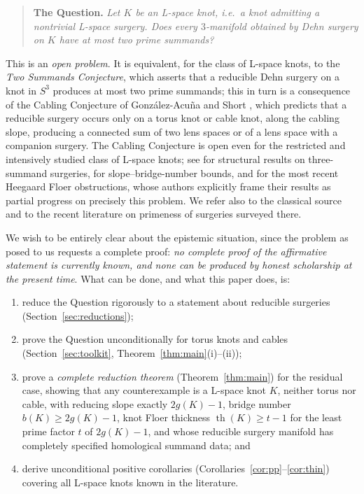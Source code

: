 \documentclass[11pt]{amsart}
\theoremstyle{definition}
\theoremstyle{remark}
\numberwithin{equation}{section}
\begin{document}
\begin{quote}
\textbf{The Question.} \emph{Let $K$ be an L-space knot, i.e.\ a knot
admitting a nontrivial L-space surgery. Does every $3$-manifold obtained
by Dehn surgery on $K$ have at most two prime summands?}
\end{quote}

This is an \emph{open problem}. It is equivalent, for the class of
L-space knots, to the \emph{Two Summands Conjecture}, which asserts that a
reducible Dehn surgery on a knot in $S^{3}$ produces at most two prime
summands; this in turn is a consequence of the Cabling Conjecture of
Gonz\'alez-Acu\~na and Short \cite{GS}, which predicts that a reducible
surgery occurs only on a torus knot or cable knot, along the cabling
slope, producing a connected sum of two lens spaces or of a lens space
with a companion surgery. The Cabling Conjecture is open even for the
restricted and intensively studied class of L-space knots; see
\cite{Howie} for structural results on three-summand surgeries,
\cite{GW} for slope--bridge-number bounds, and \cite{ORS} for the most
recent Heegaard Floer obstructions, whose authors explicitly frame their
results as partial progress on precisely this problem. We refer also to
the classical source \cite{GS} and to the recent literature on primeness
of surgeries surveyed there.

We wish to be entirely clear about the epistemic situation, since the
problem as posed to us requests a complete proof: \emph{no complete proof
of the affirmative statement is currently known, and none can be produced
by honest scholarship at the present time}. What can be done, and what
this paper does, is:

\begin{enumerate}
\item reduce the Question rigorously to a statement about reducible
surgeries (Section~\ref{sec:reductions});
\item prove the Question unconditionally for torus knots and cables
(Section~\ref{sec:toolkit}, Theorem~\ref{thm:main}(i)--(ii));
\item prove a \emph{complete reduction theorem}
(Theorem~\ref{thm:main}) for the residual case, showing that any
counterexample is a L-space knot $K$, neither torus nor cable, with
reducing slope exactly $2g(K)-1$, bridge number $b(K)\ge 2g(K)-1$,
knot Floer thickness $\operatorname{th}(K)\ge t-1$ for the least prime
factor $t$ of $2g(K)-1$, and whose reducible surgery manifold has
completely specified homological summand data; and
\item derive unconditional positive corollaries
(Corollaries~\ref{cor:pp}--\ref{cor:thin}) covering all L-space knots
known in the literature.
\end{enumerate}
\end{document}
